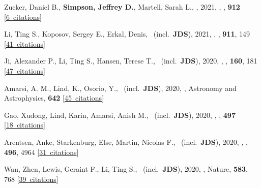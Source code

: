 \item[{\color{numcolor}\scriptsize53}] Zucker, Daniel B., \textbf{Simpson, Jeffrey D.}, Martell, Sarah L., \etal, 2021, , \apj, \textbf{912} [\href{https://ui.adsabs.harvard.edu/#abs/2021ApJ...912L..30Z}{6~citations}]

\item[{\color{numcolor}\scriptsize52}] Li, Ting S., Koposov, Sergey E., Erkal, Denis, \etal\ (incl.\ \textbf{JDS}), 2021, , \apj, \textbf{911}, 149 [\href{https://ui.adsabs.harvard.edu/#abs/2021ApJ...911..149L}{41~citations}]

\item[{\color{numcolor}\scriptsize51}] Ji, Alexander P., Li, Ting S., Hansen, Terese T., \etal\ (incl.\ \textbf{JDS}), 2020, , \aj, \textbf{160}, 181 [\href{https://ui.adsabs.harvard.edu/#abs/2020AJ....160..181J}{47~citations}]

\item[{\color{numcolor}\scriptsize50}] Amarsi, A. M., Lind, K., Osorio, Y., \etal\ (incl.\ \textbf{JDS}), 2020, , Astronomy and Astrophysics, \textbf{642} [\href{https://ui.adsabs.harvard.edu/#abs/2020A&A...642A..62A}{45~citations}]

\item[{\color{numcolor}\scriptsize49}] Gao, Xudong, Lind, Karin, Amarsi, Anish M., \etal\ (incl.\ \textbf{JDS}), 2020, , \mnras, \textbf{497} [\href{https://ui.adsabs.harvard.edu/#abs/2020MNRAS.497L..30G}{18~citations}]

\item[{\color{numcolor}\scriptsize48}] Arentsen, Anke, Starkenburg, Else, Martin, Nicolas F., \etal\ (incl.\ \textbf{JDS}), 2020, , \mnras, \textbf{496}, 4964 [\href{https://ui.adsabs.harvard.edu/#abs/2020MNRAS.496.4964A}{31~citations}]

\item[{\color{numcolor}\scriptsize47}] Wan, Zhen, Lewis, Geraint F., Li, Ting S., \etal\ (incl.\ \textbf{JDS}), 2020, , Nature, \textbf{583}, 768 [\href{https://ui.adsabs.harvard.edu/#abs/2020Natur.583..768W}{39~citations}]

